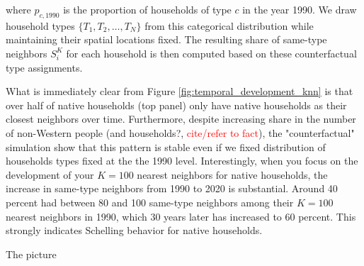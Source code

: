 \documentclass[main.tex]{subfiles}
\begin{document}
where $p_{c,1990}$ is the proportion of households of type $c$ in the year 1990. We draw household types $\{T_1, T_2, \ldots, T_N\}$ from this categorical distribution while maintaining their spatial locations fixed. The resulting share of same-type neighbors $S_i^K$ for each household is then computed based on these counterfactual type assignments.

What is immediately clear from Figure \ref{fig:temporal_development_knn} is that over half of native households (top panel) only have native households as their closest neighbors over time. Furthermore, despite increasing share in the number of non-Western people (and households?, \textcolor{red}{cite/refer to fact}), the "counterfactual" simulation show that this pattern is stable even if we fixed distribution of households types fixed at the the 1990 level. Interestingly, when you focus on the development of your $K=100$ nearest neighbors for native households, the increase in same-type neighbors from 1990 to 2020 is substantial. Around 40 percent had between 80 and 100 same-type neighbors among their $K=100$ nearest neighbors in 1990, which 30 years later has increased to 60 percent. This strongly indicates Schelling behavior for native households.

The picture 
\end{document}

